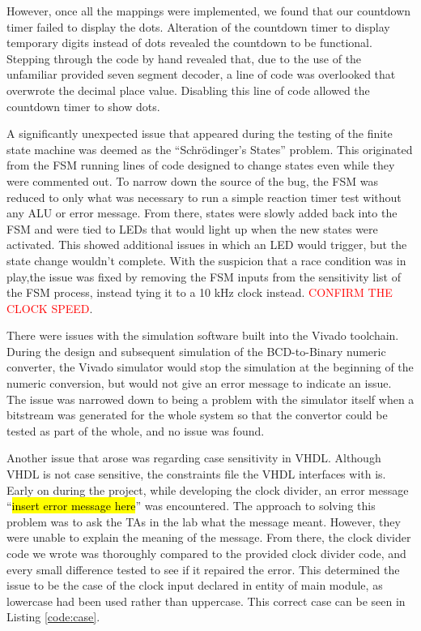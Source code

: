 \documentclass[11pt]{article}
\begin{document}
However, once all the mappings were implemented, we found that our countdown timer failed to display the dots. Alteration of the countdown timer to display temporary digits instead of dots revealed the countdown to be functional. Stepping through the code by hand revealed that, due to the use of the unfamiliar provided seven segment decoder, a line of code was overlooked that overwrote the decimal place value. Disabling this line of code allowed the countdown timer to show dots.

A significantly unexpected issue that appeared during the testing of the finite state machine was deemed as the ``Schrödinger's States'' problem. This originated from the FSM running lines of code designed to change states even while they were commented out. To narrow down the source of the bug, the FSM was reduced to only what was necessary to run a simple reaction timer test without any ALU or error message. From there, states were slowly added back into the FSM and were tied to LEDs that would light up when the new states were activated. This showed additional issues in which an LED would trigger, but the state change wouldn't complete. With the suspicion that a race condition was in play,the issue was fixed by removing the FSM inputs from the sensitivity list of the FSM process, instead tying it to a 10 kHz clock instead. \textcolor{red}{CONFIRM THE CLOCK SPEED}.

There were issues with the simulation software built into the Vivado toolchain. During the design and subsequent simulation of the BCD-to-Binary numeric converter, the Vivado simulator would stop the simulation at the beginning of the numeric conversion, but would not give an error message to indicate an issue. The issue was narrowed down to being a problem with the simulator itself when a bitstream was generated for the whole system so that the convertor could be tested as part of the whole, and no issue was found.

Another issue that arose was regarding case sensitivity in VHDL. Although VHDL is not case sensitive, the constraints file the VHDL interfaces with is. Early on during the project, while developing the clock divider, an error message ``\hl{insert error message here}'' was encountered. The approach to solving this problem was to ask the TAs in the lab what the message meant. However, they were unable to explain the meaning of the message. From there, the clock divider code we wrote was thoroughly compared to the provided clock divider code, and every small difference tested to see if it repaired the error. This determined the issue to be the case of the clock input declared in entity of main module, as lowercase had been used rather than uppercase. This correct case can be seen in Listing \ref{code:case}.
\end{document}
